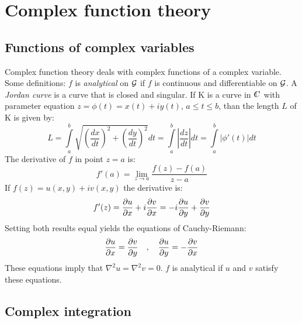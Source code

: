 \documentclass[twoside]{report}
\begin{document}
\chapter{Complex function theory}
\section{Functions of complex variables}
Complex function theory deals with complex functions of a complex variable.
Some definitions:
\npar
$f$ is {\it analytical} on $\cal G$ if $f$ is continuous and differentiable
on $\cal G$.
\npar
A {\it Jordan curve} is a curve that is closed and singular.
\npar
If K is a curve in $\CC$ with parameter equation $z=\phi(t)=x(t)+iy(t)$,
$a\leq t\leq b$, than the length $L$ of K is given by:
\[
L=\int\limits_a^b \sqrt{\left(\frac{dx}{dt}\right)^2+\left(\frac{dy}{dt}\right)^2}dt=
\int\limits_a^b\left|\frac{dz}{dt}\right|dt=\int\limits_a^b|\phi'(t)|dt
\]
The derivative of $f$ in point $z=a$ is:
\[
f'(a)=\lim_{z\rightarrow a}\frac{f(z)-f(a)}{z-a}
\]
If $f(z)=u(x,y)+iv(x,y)$ the derivative is:
\[
f'(z)=\frac{\partial u}{\partial x}+i\frac{\partial v}{\partial x}=-i\frac{\partial u}{\partial y}+\frac{\partial v}{\partial y}
\]
Setting both results equal yields the equations of Cauchy-Riemann:
\[
\frac{\partial u}{\partial x}=\frac{\partial v}{\partial y}~~~,~~~\frac{\partial u}{\partial y}=-\frac{\partial v}{\partial x}
\]
These equations imply that $\nabla^2u=\nabla^2v=0$.
$f$ is analytical if $u$ and $v$ satisfy these equations.

\section{Complex integration}
\end{document}
